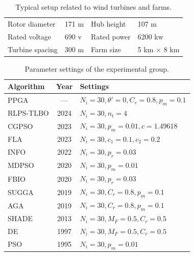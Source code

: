 \documentclass[journal,twoside]{IEEEtran}
\begin{document}
\begin{table}[t!]
	\centering
	\caption{Typical setup related to wind turbines and farms.}
	\begin{tabular}{llll}
		\hline
		Rotor diameter   & 171 m  &  Hub height  & 107 m \\ 
		Rated voltage   & 690 v   &  Rated power  & 6200 kw  \\ 
		Turbine spacing    & 300 m  & Farm size &  5 km $\times$ 8 km \\ \hline
	\end{tabular}\label{turbine}
\end{table}


\begin{table}[t!]\color{blue}
	\centering
	\caption{Parameter settings of the experimental group.}
	\label{parameters}
	\begin{tabular}{lcl}
		\hline
		Algorithm          & Year & Settings \\
		\hline
		PPGA    &  ---   & $N_i=30, \theta'=0, C_r=0.8, p_m=0.1$ \\
		RLPS-TLBO & 2024 & $N_i=30, n_t = 4 $ \\
		CGPSO & 2023   & $N_i=30, p_m = 0.01, c = 1.49618$   \\
		FLA     & 2023   &   $N_i=30, c_1=0.1, c_2=0.2$ \\
		INFO     & 2022    & $N_i=30, p_r=0.03$  \\
		MDPSO  & 2020 & $N_i=30, p_m = 0.01$ \\
		FBIO  & 2020 & $N_i=30, p_r=0.03$ \\
		SUGGA  & 2019 &  $N_i=30, C_r=0.8, p_m=0.1$ \\
		AGA  & 2019 &  $N_i=30, C_r=0.8, p_m=0.1$\\
		SHADE  & 2013 &  $N_i=30, M_F=0.5, C_r=0.5$ \\
		DE  & 1997 & $N_i=30, M_F=0.5, C_r=0.5$ \\
		PSO  & 1995 & $N_i=30, p_m = 0.01$ \\ \hline
	\end{tabular}
\end{table}
\end{document}
